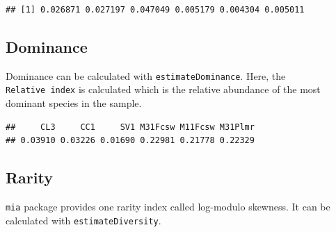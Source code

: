 \documentclass[
]{book}
\newenvironment{Shaded}{\begin{snugshade}}{\end{snugshade}}
\newcommand{\AttributeTok}[1]{\textcolor[rgb]{0.77,0.63,0.00}{#1}}
\newcommand{\FunctionTok}[1]{\textcolor[rgb]{0.00,0.00,0.00}{#1}}
\newcommand{\NormalTok}[1]{#1}
\newcommand{\OtherTok}[1]{\textcolor[rgb]{0.56,0.35,0.01}{#1}}
\newcommand{\SpecialCharTok}[1]{\textcolor[rgb]{0.00,0.00,0.00}{#1}}
\newcommand{\StringTok}[1]{\textcolor[rgb]{0.31,0.60,0.02}{#1}}
\begin{document}
\begin{verbatim}
## [1] 0.026871 0.027197 0.047049 0.005179 0.004304 0.005011
\end{verbatim}

\hypertarget{dominance}{%
\subsection{Dominance}\label{dominance}}

Dominance can be calculated with \texttt{estimateDominance}. Here, the \texttt{Relative\ index} is calculated which is the relative abundance of the most dominant species in the sample.

\begin{Shaded}
\end{Shaded}

\begin{verbatim}
##     CL3     CC1     SV1 M31Fcsw M11Fcsw M31Plmr 
## 0.03910 0.03226 0.01690 0.22981 0.21778 0.22329
\end{verbatim}

\hypertarget{rarity}{%
\subsection{Rarity}\label{rarity}}

\texttt{mia} package provides one rarity index called log-modulo skewness. It can be
calculated with \texttt{estimateDiversity}.

\begin{Shaded}
\end{Shaded}
\end{document}
